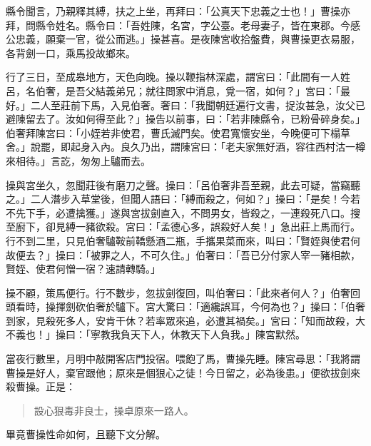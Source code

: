 縣令聞言，乃親釋其縛，扶之上坐，再拜曰：「公真天下忠義之士也！」曹操亦拜，問縣令姓名。縣令曰：「吾姓陳，名宮，字公臺。老母妻子，皆在東郡。今感公忠義，願棄一官，從公而逃。」操甚喜。是夜陳宮收拾盤費，與曹操更衣易服，各背劍一口，乘馬投故鄉來。

行了三日，至成皋地方，天色向晚。操以鞭指林深處，謂宮曰：「此間有一人姓呂，名伯奢，是吾父結義弟兄；就往問家中消息，覓一宿，如何？」宮曰：「最好。」二人至莊前下馬，入見伯奢。奢曰：「我聞朝廷遍行文書，捉汝甚急，汝父已避陳留去了。汝如何得至此？」操告以前事，曰：「若非陳縣令，已粉骨碎身矣。」伯奢拜陳宮曰：「小姪若非使君，曹氏滅門矣。使君寬懷安坐，今晚便可下榻草舍。」說罷，即起身入內。良久乃出，謂陳宮曰：「老夫家無好酒，容往西村沽一樽來相待。」言訖，匆匆上驢而去。

操與宮坐久，忽聞莊後有磨刀之聲。操曰：「呂伯奢非吾至親，此去可疑，當竊聽之。」二人潛步入草堂後，但聞人語曰：「縛而殺之，何如？」操曰：「是矣！今若不先下手，必遭擒獲。」遂與宮拔劍直入，不問男女，皆殺之，一連殺死八口。搜至廚下，卻見縛一豬欲殺。宮曰：「孟德心多，誤殺好人矣！」急出莊上馬而行。行不到二里，只見伯奢驢鞍前鞽懸酒二瓶，手攜果菜而來，叫曰：「賢姪與使君何故便去？」操曰：「被罪之人，不可久住。」伯奢曰：「吾已分付家人宰一豬相款，賢姪、使君何憎一宿？速請轉騎。」

操不顧，策馬便行。行不數步，忽拔劍復回，叫伯奢曰：「此來者何人？」伯奢回頭看時，操揮劍砍伯奢於驢下。宮大驚曰：「適纔誤耳，今何為也？」操曰：「伯奢到家，見殺死多人，安肯干休？若率眾來追，必遭其禍矣。」宮曰：「知而故殺，大不義也！」操曰：「寧教我負天下人，休教天下人負我。」陳宮默然。

當夜行數里，月明中敲開客店門投宿。喂飽了馬，曹操先睡。陳宮尋思：「我將謂曹操是好人，棄官跟他；原來是個狠心之徒！今日留之，必為後患。」便欲拔劍來殺曹操。正是：

\begin{quote}
設心狠毒非良士，操卓原來一路人。
\end{quote}

畢竟曹操性命如何，且聽下文分解。
